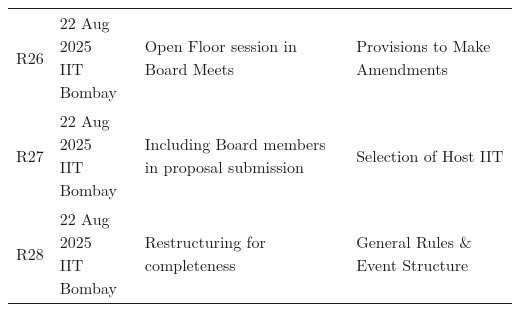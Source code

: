 \begin{center}
\begin{longtable}{c m{3.2cm} m{6.2cm} m{3.5cm}}
R26 & \makecell[l]{22 Aug 2025\\ IIT Bombay} & Open Floor session in Board Meets &  Provisions to Make Amendments \\
R27 & \makecell[l]{22 Aug 2025\\ IIT Bombay} & Including Board members in proposal submission & Selection of Host IIT \\
R28 & \makecell[l]{22 Aug 2025\\ IIT Bombay} & Restructuring for completeness & General Rules \& Event Structure \\
\hline
\end{longtable}
\end{center}